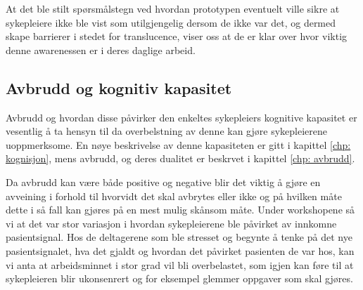\noindent
At det ble stilt spørsmålstegn ved hvordan prototypen eventuelt ville sikre at sykepleiere ikke ble vist som utilgjengelig dersom de ikke var det, og dermed skape barrierer i stedet for translucence, viser oss at de er klar over hvor viktig denne awarenessen er i deres daglige arbeid. 


\subsection{Avbrudd og kognitiv kapasitet}
Avbrudd og hvordan disse påvirker den enkeltes sykepleiers kognitive kapasitet er vesentlig å ta hensyn til da overbelstning av denne kan gjøre sykepleierene uoppmerksome. En nøye beskrivelse av denne kapasiteten er gitt i kapittel \ref{chp: kognisjon}, mens avbrudd, og deres dualitet er beskrvet i kapittel \ref{chp: avbrudd}. 

\noindent
Da avbrudd kan være både positive og negative blir det viktig å gjøre en avveining i forhold til hvorvidt det skal avbrytes eller ikke og på hvilken måte dette i så fall kan gjøres på en mest mulig skånsom måte. Under workshopene så vi at det var stor variasjon i hvordan sykepleierene ble påvirket av innkomne pasientsignal. Hos de deltagerene som ble stresset og begynte å tenke på det nye pasientsignalet, hva det gjaldt og hvordan det påvirket pasienten de var hos, kan vi anta at arbeidsminnet i stor grad vil bli overbelastet, som igjen kan føre til at sykepleieren blir ukonsenrert og for eksempel glemmer oppgaver som skal gjøres. 

